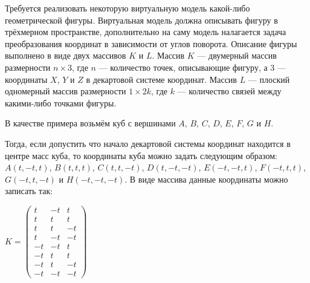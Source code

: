 
Требуется реализовать некоторую виртуальную модель какой-либо геометрической фигуры. Виртуальная модель должна описывать фигуру в трёхмерном пространстве, дополнительно на саму модель налагается задача преобразования координат в зависимости от углов поворота. Описание фигуры выполнено в виде двух массивов $K$ и $L$. Массив $K$ --- двумерный массив размерности $n \times 3$, где $n$ --- количество точек, описывающие фигуру, а 3 --- координаты $X$, $Y$ и $Z$ в декартовой системе координат. Массив $L$ --- плоский одномерный массив размерности $1 \times 2k$, где $k$ --- количество связей между какими-либо точками фигуры. 

В качестве примера возьмём куб с вершинами $A$, $B$, $C$, $D$, $E$, $F$, $G$ и $H$.


Тогда, если допустить что начало декартовой системы координат находится в центре масс куба, то координаты куба можно задать следующим образом: $A(t, -t, t)$, $B(t, t, t)$, $C(t, t, -t)$, $D(t, -t, -t)$, $E(-t, -t, t)$, $F(-t, t, t)$, $G(-t, t, -t)$ и $H(-t, -t, -t)$. В виде массива данные координаты можно записать так:

$K =
\begin{pmatrix}
t & -t & t \\
t & t & t \\
t & t & -t \\
t & -t & -t \\
-t & -t & t \\
-t & t & t \\
-t & t & -t \\
-t & -t & -t
\end{pmatrix}$

